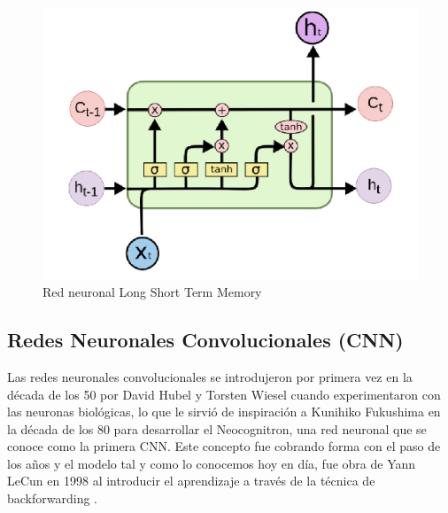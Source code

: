 \begin{figure}[h]
	\centering
	\includegraphics[width = 1 \textwidth]{Imagenes/Vectorial/lstm.png}
	\caption{Red neuronal Long Short Term Memory \citep{fotolstm}}
	\label{fig:lstm}
\end{figure}



\subsection{Redes Neuronales Convolucionales (CNN)}

Las redes neuronales convolucionales se introdujeron por primera vez en la década de los 50 por David Hubel y Torsten Wiesel cuando experimentaron con las neuronas biológicas, lo que le sirvió de inspiración a Kunihiko Fukushima en la década de los 80 para desarrollar el Neocognitron, una red neuronal que se conoce como la primera CNN. Este concepto fue cobrando forma con el paso de los años y el modelo tal y como lo conocemos hoy en día, fue obra de Yann LeCun en 1998 al introducir el aprendizaje a través de la técnica de backforwarding \citep{berzal2019redes}.	\\

